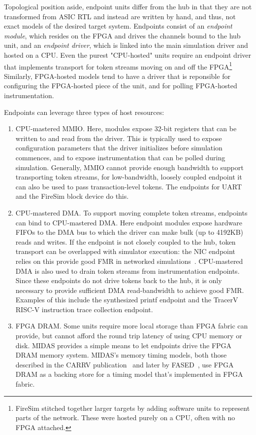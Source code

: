 Topological position aside, endpoint units differ from the hub in that they are not transformed from ASIC
RTL and instead are written by hand, and thus, not exact models of the desired target system.
Endpoints consist of an \emph{endpoint module}, which resides on the FPGA and drives the channels bound to the hub unit, and an
\emph{endpoint driver}, which is linked into the main simulation driver and hosted on a CPU.
Even the purest "CPU-hosted" units require an endpoint driver that
implements transport for token streams moving on and off the
FPGA\footnote{FireSim stitched together larger targets by adding software units
to represent parts of the network. These were hosted purely on a CPU, often
with no FPGA attached.} Similarly, FPGA-hosted models tend to have a driver
that is reponsible for configuring the FPGA-hosted piece of the unit, and for
polling FPGA-hosted instrumentation.

Endpoints can leverage three types of host resources:

\begin{enumerate}
\item CPU-mastered MMIO. Here, modules expose 32-bit registers that can be
    written to and read from the driver. This is typically used to expose
    configuration  parameters that the driver initializes before simulation
    commences, and to expose instrumentation that can be polled during
    simulation. Generally, MMIO cannot provide enough bandwidth to support transporting token streams,
    for low-bandwidth, loosely coupled endpoint it can also be used to pass transaction-level tokens.
    The endpoints for UART and the FireSim block device do this.

\item CPU-mastered DMA. To support moving complete token streams, endpoints can
    bind to CPU-mastered DMA. Here endpoint modules expose hardware FIFOs to the DMA bus to which the driver
    can make bulk (up to 4192KB) reads and writes. If the endpoint is not closely coupled
    to the hub, token transport can be overlapped with simulator execution: the NIC endpoint relies on this
    provide good FMR in networked simulations~\cite{FireSim}. CPU-mastered DMA is also used 
    to drain token streams from instrumentation endpoints. Since these endpoints do not drive
    tokens back to the hub, it is only necessary to provide sufficient DMA read-bandwidth to achieve good FMR.
    Examples of this include the synthesized printf endpoint and the TracerV
    RISC-V instruction trace collection endpoint.

\item FPGA DRAM. Some units require more local storage than FPGA fabric can
    provide, but cannot afford the round trip latency of using CPU memory or
    disk. MIDAS provides a simple means to let endpoints drive the FPGA
    DRAM memory system.  MIDAS's memory timing models, both those described
    in the CARRV publication~\cite{MIDAS} and later by FASED~\cite{FASED},
    use FPGA DRAM as a backing store for a timing model that's implemented
    in FPGA fabric.
\end{enumerate}

